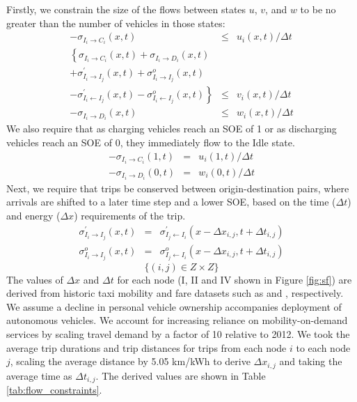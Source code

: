 \documentclass[conference]{IEEEtran}
\begin{document}
Firstly, we constrain the size of the flows between states $u$, $v$, and $w$ to be no greater than the number of vehicles in those states:
\begin{eqnarray*}
    -\sigma_{I_i \rightarrow C_i}(x,t) & \le & u_i(x,t) / \Delta t \\
  \left\{ \sigma_{I_i \rightarrow C_i}(x,t) + \sigma_{I_i \rightarrow D_i}(x,t) \right. && \\
  + \sigma_{I_i \rightarrow I_j}^\prime(x,t) + \sigma_{I_i \rightarrow I_j}^o(x,t) && \\
  \left. - \sigma_{I_i \leftarrow I_j}^\prime(x,t) - \sigma_{I_i \leftarrow I_j}^o(x,t) \right\} & \le & v_i(x,t) / \Delta t \\
    -\sigma_{I_i \rightarrow D_i}(x,t) & \le & w_i(x,t) / \Delta t
\end{eqnarray*}
We also require that as charging vehicles reach an SOE of 1 or as discharging vehicles reach an SOE of 0, they immediately flow to the Idle state.
\begin{eqnarray*}
    -\sigma_{I_i \rightarrow C_i}(1,t) & = & u_i(1,t) / \Delta t \\
    -\sigma_{I_i \rightarrow D_i}(0,t) & = & w_i(0,t) / \Delta t
\end{eqnarray*}
Next, we require that trips be conserved between origin-destination pairs, where arrivals are shifted to a later time step and a lower SOE, based on the time ($\Delta t$) and energy ($\Delta x$) requirements of the trip.
\begin{eqnarray*}
    \sigma_{I_i \rightarrow I_j}^\prime(x,t) & = & \sigma_{I_j \leftarrow I_i}^\prime(x - \Delta x_{i,j},t + \Delta t_{i,j}) \\
     \sigma_{I_i \rightarrow I_j}^o(x,t) & = & \sigma_{I_j \leftarrow I_i}^o(x - \Delta x_{i,j},t + \Delta t_{i,j})
\end{eqnarray*}
\begin{equation*}
\{(i,j) \in Z \times Z\} 
\end{equation*}
The values of $\Delta x$ and $\Delta t$ for each node (I, II and IV shown in Figure \ref{fig:sf}) are derived from historic taxi mobility and fare datasets such as \cite{mobility2009} and \cite{fares2017}, respectively. We assume a decline in personal vehicle ownership accompanies deployment of autonomous vehicles. We account for increasing reliance on mobility-on-demand services by scaling travel demand by a factor of 10 relative to 2012. We took the average trip durations and trip distances for trips from each node $i$ to each node $j$, scaling the average distance by 5.05 km/kWh to derive $\Delta x_{i,j}$ and taking the average time as $\Delta t_{i,j}$. The derived values are shown in Table \ref{tab:flow_constraints}.
\end{document}
